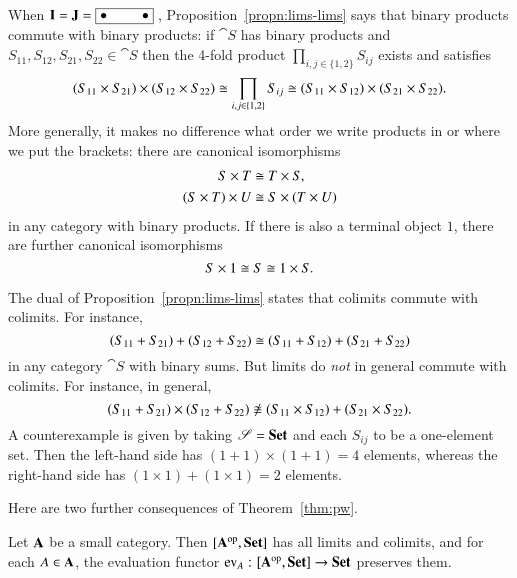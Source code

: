 \begin{example}        
\label{eg:lims-lims}
When $\mathbf{I} = \mathbf{J} = \fbox{$\bullet \hspace*{2.5em} \bullet$}\ $,
Proposition~\ref{propn:lims-lims} says that binary products commute with
binary products: if $\cat{S}$ has binary products and $S_{11}, S_{12},
S_{21}, S_{22} \in \cat{S}$ then the 4-fold product $\prod_{i, j \in \{1,
  2\}} S_{ij}$ exists and satisfies
\[
(S_{11} \times S_{21}) \times (S_{12} \times S_{22})
\cong
\prod_{i, j \in \{1, 2\}} S_{ij}
\cong
(S_{11} \times S_{12}) \times (S_{21} \times S_{22}).
\]
More generally, it makes no difference what order we write products in or
where we put the brackets: there are canonical isomorphisms
% 
\begin{align*}
S \times T              &
\iso   
T \times S,             
%
\index{product!commutativity of}
%
\\
(S \times T) \times U   &
\iso   
S \times (T \times U)
%
\index{product!associativity of}%
\index{associativity}
% 
\end{align*}
% 
in any category with binary products.   If there is also a terminal object
$1$, there are further canonical isomorphisms
\[
S \times 1 
\cong 
S 
\cong 
1 \times S.
\]
\end{example}

\begin{warning}
The dual of Proposition~\ref{propn:lims-lims} states that colimits commute
with colimits.  For instance,
\[
(S_{11} + S_{21}) + (S_{12} + S_{22})
\cong
(S_{11} + S_{12}) + (S_{21} + S_{22})
\]
in any category $\cat{S}$ with binary sums.  But limits do \emph{not}%
%
%
in general commute with colimits.  For instance, in general,
\[
(S_{11} + S_{21}) \times (S_{12} + S_{22})
\not\iso
(S_{11} \times S_{12}) + (S_{21} \times S_{22}).
\]
A counterexample is given by taking $\mathscr{S} = \mathbf{Set}$ and each $S_{ij}$ to be a
one-element set.  Then the left-hand side has $(1 + 1) \times (1 + 1) = 4$
elements, whereas the right-hand side has $(1 \times 1) + (1 \times 1) = 2$
elements.
\end{warning}

Here are two further consequences of Theorem~\ref{thm:pw}.

\begin{cor}
%
% 
Let $\mathbf{A}$ be a small category.  Then $[\mathbf{A}^{\mathrm{op}},\mathbf{Set}]$ has all limits and
colimits, and for each $A \in \mathbf{A}$, the evaluation functor $\ev_A\from
\pshf{\scat{A}} \to \Set$ preserves them.
\end{cor}

